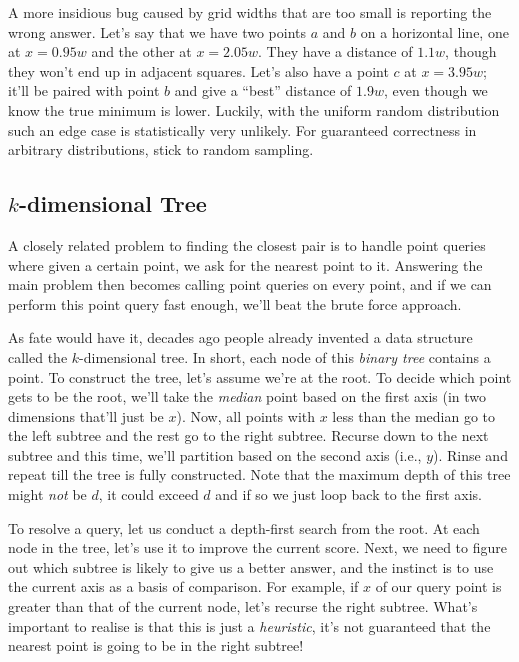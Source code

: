 \begin{aside}
     A more insidious bug caused by grid widths that are too small is reporting the wrong answer.
     Let's say that we have two points $a$ and $b$ on a horizontal line, one at $x = 0.95w$
     and the other at $x = 2.05w$. They have a distance of $1.1w$, though they won't end up
     in adjacent squares. Let's also have a point $c$ at $x = 3.95w$; it'll be paired
     with point $b$ and give a ``best'' distance of $1.9w$, even though we know the true
     minimum is lower. Luckily, with the uniform random distribution such an edge case
     is statistically very unlikely. For guaranteed correctness in arbitrary distributions, stick to
     random sampling.
\end{aside}

\subsection{\texorpdfstring{$k$}{k}-dimensional Tree}

A closely related problem to finding the closest pair is to handle point queries where given a
certain point, we ask for the nearest point to it. Answering the main problem then becomes
calling point queries on every point, and if we can perform this point query fast enough, we'll
beat the brute force approach.

As fate would have it, decades ago people already invented a data structure called the $k$-dimensional
tree. In short, each node of this \textit{binary tree} contains a point. To construct the tree,
let's assume we're at the root. To decide which point gets to be the root, we'll take the \textit{median}
point based on the first axis (in two dimensions that'll just be $x$). Now, all points with $x$ less
than the median go to the left subtree and the rest go to the right subtree. Recurse down to
the next subtree and this time, we'll partition based on the second axis (i.e., $y$). Rinse and
repeat till the tree is fully constructed. Note that the maximum depth of this tree might \textit{not}
be $d$, it could exceed $d$ and if so we just loop back to the first axis.

To resolve a query, let us conduct a depth-first search from the root.
At each node in the tree, let's use it to improve the current score. Next, we need to figure
out which subtree is likely to give us a better answer, and the instinct is to use the current
axis as a basis of comparison. For example, if $x$ of our query point is greater than that of the
current node, let's recurse the right subtree. What's important to realise is that this
is just a \textit{heuristic}, it's not guaranteed that the nearest point is going to be in
the right subtree!

